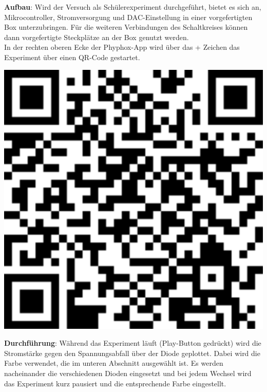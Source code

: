 \documentclass[../main.tex]{subfiles}
\begin{document}
\begin{tcolorbox}
\vspace{0.5cm}
\begin{minipage}[c]{0.75\textwidth}
    \textbf{Aufbau}: Wird der Versuch als Schülerexperiment durchgeführt, bietet es sich an, Mikrocontroller, Stromversorgung und DAC-Einstellung in einer vorgefertigten Box unterzubringen. Für die weiteren Verbindungen des Schaltkreises können dann vorgefertigte Steckplätze an der Box genutzt werden.\\
In der rechten oberen Ecke der Phyphox-App wird über das + Zeichen das Experiment über einen QR-Code gestartet. 
    \end{minipage}
    \hspace{0.5cm}
    \begin{minipage}[c]{0.2\textwidth}
        \centering
        \includegraphics[width=1\textwidth]{img/qr_code}
    \end{minipage}

    \vspace{0.5cm}
    \textbf{Durchführung}: Während das Experiment läuft (Play-Button gedrückt) wird die Stromstärke gegen den Spannungsabfall über der Diode geplottet. Dabei wird die Farbe verwendet, die im unteren Abschnitt ausgewählt ist. Es werden nacheinander die verschiedenen Dioden eingesetzt und bei jedem Wechsel wird das Experiment kurz pausiert und die entsprechende Farbe eingestellt.


\end{tcolorbox}
\end{document}
